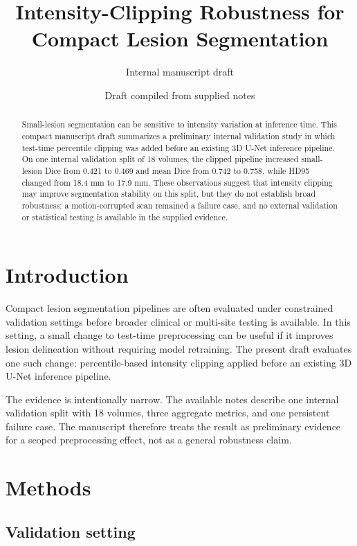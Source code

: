 \documentclass[11pt]{article}
\title{Intensity-Clipping Robustness for Compact Lesion Segmentation}
\author{Internal manuscript draft}
\date{Draft compiled from supplied notes}
\begin{document}
\maketitle

\begin{abstract}
Small-lesion segmentation can be sensitive to intensity variation at inference time. This compact manuscript draft summarizes a preliminary internal validation study in which test-time percentile clipping was added before an existing 3D U-Net inference pipeline. On one internal validation split of 18 volumes, the clipped pipeline increased small-lesion Dice from 0.421 to 0.469 and mean Dice from 0.742 to 0.758, while HD95 changed from 18.4 mm to 17.9 mm. These observations suggest that intensity clipping may improve segmentation stability on this split, but they do not establish broad robustness: a motion-corrupted scan remained a failure case, and no external validation or statistical testing is available in the supplied evidence.
\end{abstract}

\section{Introduction}

Compact lesion segmentation pipelines are often evaluated under constrained validation settings before broader clinical or multi-site testing is available. In this setting, a small change to test-time preprocessing can be useful if it improves lesion delineation without requiring model retraining. The present draft evaluates one such change: percentile-based intensity clipping applied before an existing 3D U-Net inference pipeline.

The evidence is intentionally narrow. The available notes describe one internal validation split with 18 volumes, three aggregate metrics, and one persistent failure case. The manuscript therefore treats the result as preliminary evidence for a scoped preprocessing effect, not as a general robustness claim.

\section{Methods}

\subsection{Validation setting}
\end{document}
